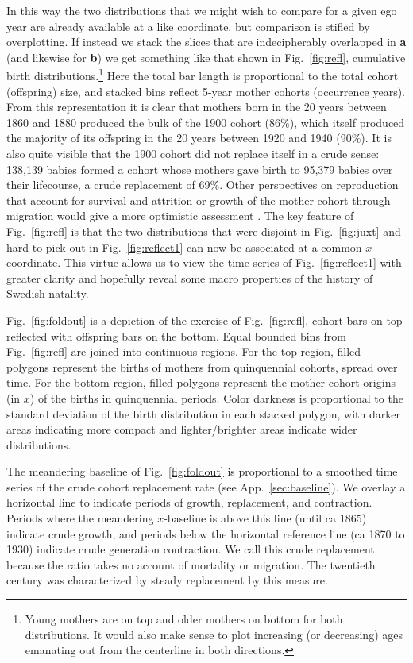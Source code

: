 \documentclass{article}
\begin{document}
In this way the two distributions that we might wish to compare for a given ego year are already available at a like coordinate, but comparison is stifled by overplotting. If instead we stack the slices that are indecipherably overlapped in \textbf{a} (and likewise for \textbf{b}) we get something like that shown in Fig.~\ref{fig:refl}, cumulative birth distributions.\footnote{Young mothers are on top and older mothers on bottom for both distributions. It would also make sense to plot increasing (or decreasing) ages emanating out from the centerline in both directions.} Here the total bar length is proportional to the total cohort (offspring) size, and stacked bins reflect 5-year mother cohorts (occurrence years). From this representation it is clear that mothers born in the 20 years between 1860 and 1880 produced the bulk of the 1900 cohort (86\%), which itself produced the majority of its offspring in the 20 years between 1920 and 1940 (90\%). It is also quite visible that the 1900 cohort did not replace itself in a crude sense: 138,139 babies formed a cohort whose mothers gave birth to 95,379 babies over their lifecourse, a crude replacement of 69\%. Other perspectives on reproduction that account for survival and attrition or growth of the mother cohort through migration would give a more optimistic assessment \citep{henry1965reflexions}. The key feature of Fig.~\ref{fig:refl} is that the two distributions that were disjoint in Fig.~\ref{fig:juxt} and hard to pick out in Fig.~\ref{fig:reflect1} can now be associated at a common $x$ coordinate. This virtue allows us to view the time series of Fig.~\ref{fig:reflect1} with greater clarity and hopefully reveal some macro properties of the history of Swedish natality.

Fig.~\ref{fig:foldout} is a depiction of the exercise of Fig.~\ref{fig:refl}, cohort bars on top reflected with offspring bars on the bottom. Equal bounded bins from Fig.~\ref{fig:refl} are joined into continuous regions. For the top region, filled polygons represent the births of mothers from quinquennial cohorts, spread over time. For the bottom region, filled polygons represent the mother-cohort origins (in $x$) of the births in quinquennial periods. Color darkness is proportional to the standard deviation of the birth distribution in each stacked polygon, with darker areas indicating more compact and lighter/brighter areas indicate wider distributions.

The meandering baseline of Fig.~\ref{fig:foldout} is proportional to a smoothed time series of the crude cohort replacement rate (see App.~\ref{sec:baseline}). We overlay a horizontal line to indicate periods of growth, replacement, and contraction. Periods where the meandering $x$-baseline is above this line (until ca 1865) indicate crude growth, and periods below the horizontal reference line (ca 1870 to 1930) indicate crude generation contraction. We call this crude replacement because the ratio takes no account of mortality or migration. The twentieth century was characterized by steady replacement by this measure.
\end{document}
